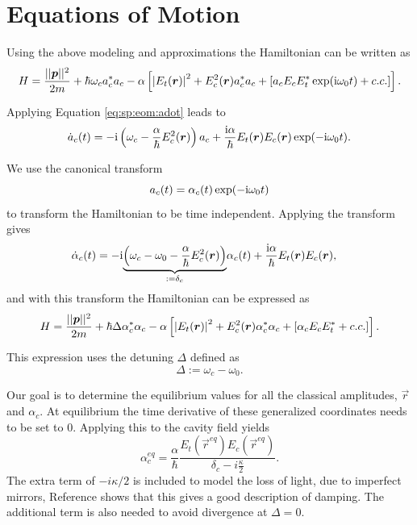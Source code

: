 \section{Equations of Motion}
\label{sec:sp:hameqs}

Using the above modeling and approximations
    the Hamiltonian can be written as
\begin{equation}
    H = \frac{||\bm{p}||^2}{2m} 
        + \hbar \omega_c a_c^* a_c
        - \alpha \left[ \left|E_t(\bm{r})\right|^2  +E_c^2(\bm{r}) a_c^* a_c
            + \left[a_c E_cE_t^* \exp(\mathrm{i}\omega_0 t) + c.c. \right]\right].
\end{equation}

Applying Equation \eqref{eq:sp:eom:adot} leads to
\begin{equation}
\label{eq:sp:dotat}
    \dot a_c(t) = -\mathrm{i} \left(\omega_c - \frac{\alpha}{\hbar} E_c^2(\bm{r}) \right)a_c + \frac{\mathrm{i}\alpha}{\hbar} E_t(\bm{r})E_c(\bm{r}) \exp(-\mathrm{i}\omega_0 t).
\end{equation}

We use the canonical transform
\begin{equation}
    a_c(t) = \alpha_c(t)\exp(-\mathrm{i}\omega_0 t)
\end{equation}
to transform the Hamiltonian to be time independent.
Applying the transform gives
\begin{align}
\label{eq:sp:dotalpht}
    \dot \alpha_c(t) 
        &= -\mathrm{i} \underset{:=\delta_c}{\underbrace{\left(\omega_c -\omega_0 - \frac{\alpha}{\hbar} E_c^2(\bm{r}) \right) }}\alpha_c(t)
            + \frac{\mathrm{i}\alpha}{\hbar} E_t(\bm{r})E_c(\bm{r}),
\end{align}
and with this transform the Hamiltonian can be expressed as
\begin{equation}
     H = \frac{||\bm{p}||^2}{2m} 
        + \hbar \Delta \alpha_c^* \alpha_c
        - \alpha \left[ \left|E_t(\bm{r})\right|^2  +E_c^2(\bm{r}) \alpha_c^* \alpha_c+ \left[
            \alpha_c E_cE_t^* + c.c. 
        \right]\right].
\end{equation}

This expression uses the detuning $\Delta$ defined as
\begin{equation}
\label{eq:sp:def:detuning}
    \Delta := \omega_c - \omega_0.
\end{equation}

Our goal is to determine the equilibrium values for all the classical amplitudes, $\vec r$ and $\alpha_c$.
At equilibrium the time derivative of these generalized coordinates needs to be set to $0$.
Applying this to the cavity field yields
\begin{equation}
    \alpha_c^{eq} = \frac{\alpha}{\hbar} 
        \frac{E_t(\vec r^{eq}) E_c(\vec r^{eq})}{\delta_c - i \frac{\kappa}{2}}.
\end{equation}
The extra term of $-i\kappa/2$ is included to model the loss of light, 
    due to imperfect mirrors,
     Reference \cite{Gonzalez_Ballestero_2019} shows that this gives a good description of damping.
The additional term is also needed to avoid divergence at $\Delta = 0$.

